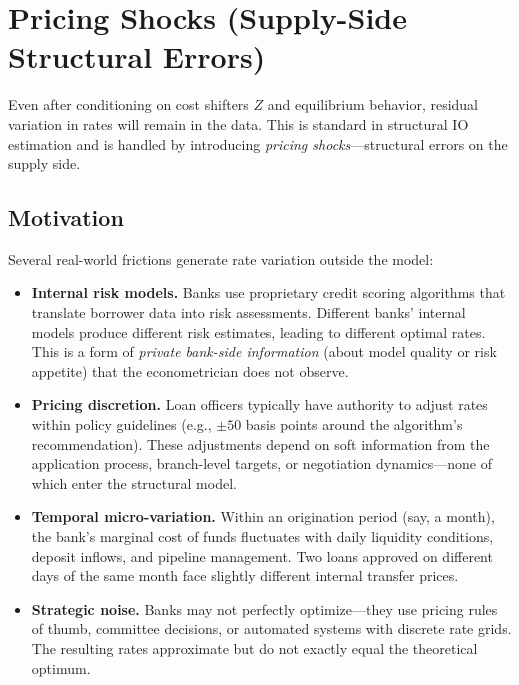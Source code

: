 \documentclass[12pt]{article}
\theoremstyle{plain}
\theoremstyle{plain}
\theoremstyle{definition}  %
\theoremstyle{remark}  %
\begin{document}

\section{Pricing Shocks (Supply-Side Structural Errors)}\label{sec:pricing_errors}

Even after conditioning on cost shifters $Z$ and equilibrium behavior, residual variation in rates will remain in the data. This is standard in structural IO estimation and is handled by introducing \emph{pricing shocks}---structural errors on the supply side.

\subsection{Motivation}

Several real-world frictions generate rate variation outside the model:
\begin{itemize}
    \item \textbf{Internal risk models.} Banks use proprietary credit scoring algorithms that translate borrower data into risk assessments. Different banks' internal models produce different risk estimates, leading to different optimal rates. This is a form of \emph{private bank-side information} (about model quality or risk appetite) that the econometrician does not observe.
    \item \textbf{Pricing discretion.} Loan officers typically have authority to adjust rates within policy guidelines (e.g., $\pm 50$ basis points around the algorithm's recommendation). These adjustments depend on soft information from the application process, branch-level targets, or negotiation dynamics---none of which enter the structural model.
    \item \textbf{Temporal micro-variation.} Within an origination period (say, a month), the bank's marginal cost of funds fluctuates with daily liquidity conditions, deposit inflows, and pipeline management. Two loans approved on different days of the same month face slightly different internal transfer prices.
    \item \textbf{Strategic noise.} Banks may not perfectly optimize---they use pricing rules of thumb, committee decisions, or automated systems with discrete rate grids. The resulting rates approximate but do not exactly equal the theoretical optimum.
\end{itemize}
\end{document}
